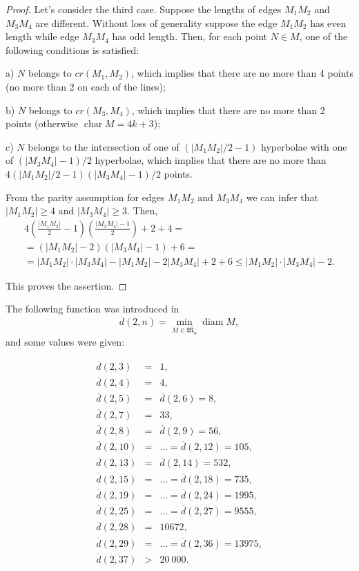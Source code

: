 \documentclass[a4paper,14pt]{article} %
\theoremstyle{plain}
\theoremstyle{definition}
\begin{document}
\begin{proof}
	Let's consider the third case. Suppose the lengths of edges $M_1M_2$ and $M_3M_4$ are different. Without loss of generality suppose the edge $M_1M_2$ has even length while edge $M_3 M_4$ has odd length.
	Then, for each point $N\in M$, one of the following conditions is satisfied:

	a) $N$ belongs to $cr(M_1, M_2)$, which implies that there are no more than 4 points (no more than 2 on each of the lines);

	b) $N$ belongs to $cr(M_3,M_4)$, which implies that there are no more than 2 points (otherwise $\operatorname{char} M = 4k+3$);

	c) $N$ belongs to the intersection of one of $(|{M_1 M_2}|/2-1)$ hyperbolae with one of $(|M_3 M_4|-1)/2$ hyperbolae, which implies that there are no more than $4(|M_1 M_2|/2-1)(|M_3 M_4|-1)/2$ points.

	From the parity assumption for edges $M_1 M_2$ and $M_3 M_4$
	we can infer that $|M_1 M_2|\geq4$ and $|M_3M_4|\geq3$.
	Then,
	\begin{multline}
		4\left(\frac{|M_1 M_2|}{2} - 1\right) \left(\frac{|M_3 M_4| - 1}{2}\right) + 2 + 4
		=
		\\=
		(|M_1 M_2| - 2)(|M_3 M_4| - 1) + 6
		=
		\\=
		|M_1 M_2| \cdot |M_3 M_4| - |M_1 M_2| - 2 |M_3 M_4| + 2 + 6
		\leq
		|M_1 M_2| \cdot |M_3 M_4| - 2
		.
	\end{multline}

	This proves the assertion.
\end{proof}


The following function was introduced in~\cite{kurz2008minimum}
\begin{equation}
	\overline{d}(2,n) = \min_{M\in\overline{\mathfrak{M}_{n}}} \operatorname{diam} M
	,
\end{equation}
and some values were given:




\begin{eqnarray}
\label{d}
\overline{d}(2,3)&=& 1,{}\nonumber\\
\overline{d}(2,4)&=& 4,{}\nonumber\\
\overline{d}(2,5)&=&  \overline{d}(2,6)= 8,{}\nonumber\\
\overline{d}(2,7)&=& 33,{}\nonumber\\
\overline{d}(2,8)&=&  \overline{d}(2,9)= 56,{}\nonumber\\
\overline{d}(2,10)&=& ... =\overline{d}(2,12)= 105,{}\nonumber\\
\overline{d}(2,13)&=&  \overline{d}(2,14)= 532,{}\nonumber\\
\overline{d}(2,15)&=&  ... = \overline{d}(2,18) = 735,{}\nonumber\\
\overline{d}(2,19)&=& ... = \overline{d}(2,24) = 1995,{}\nonumber\\
\overline{d}(2,25)&=&  ... = \overline{d}(2,27)= 9555,{}\nonumber\\
\overline{d}(2,28)&=& 10672,{}\nonumber\\
\overline{d}(2,29)&=&  ... = \overline{d}(2,36) = 13975,{}\nonumber\\
\overline{d}(2,37) &>& 20\ 000.
\end{eqnarray}
\end{document}
